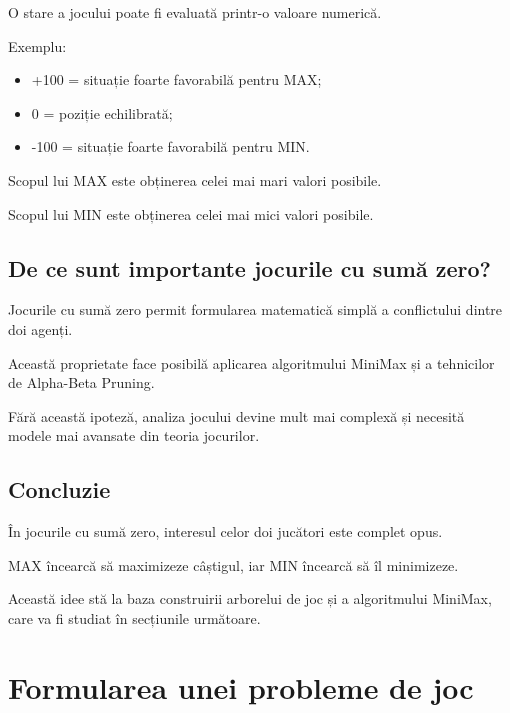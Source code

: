 \documentclass[12pt,a4paper]{article}
\begin{document}
O stare a jocului poate fi evaluată printr-o valoare numerică.

Exemplu:

\begin{itemize}
\item +100 = situație foarte favorabilă pentru MAX;
\item 0 = poziție echilibrată;
\item -100 = situație foarte favorabilă pentru MIN.
\end{itemize}

Scopul lui MAX este obținerea celei mai mari valori posibile.

Scopul lui MIN este obținerea celei mai mici valori posibile.

\subsection{De ce sunt importante jocurile cu sumă zero?}

Jocurile cu sumă zero permit formularea matematică simplă a conflictului dintre doi agenți.

Această proprietate face posibilă aplicarea algoritmului MiniMax și a tehnicilor de Alpha-Beta Pruning.

Fără această ipoteză, analiza jocului devine mult mai complexă și necesită modele mai avansate din teoria jocurilor.

\subsection{Concluzie}

În jocurile cu sumă zero, interesul celor doi jucători este complet opus.

MAX încearcă să maximizeze câștigul, iar MIN încearcă să îl minimizeze.

Această idee stă la baza construirii arborelui de joc și a algoritmului MiniMax, care va fi studiat în secțiunile următoare.


















\section{Formularea unei probleme de joc}
\end{document}

